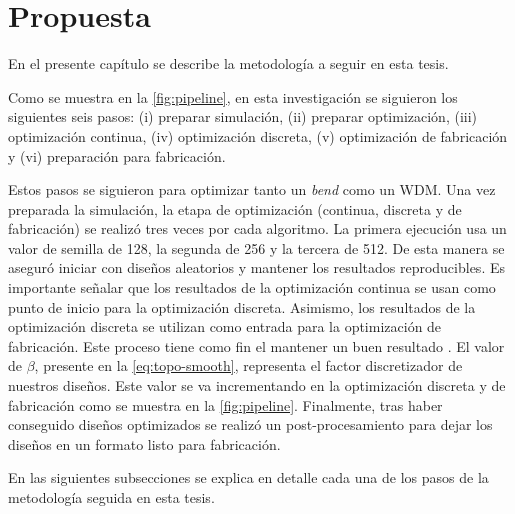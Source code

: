 \chapter{Propuesta}

En el presente capítulo se describe la metodología a seguir en esta tesis.

Como se muestra en la \autoref{fig:pipeline}, en esta investigación se siguieron los siguientes seis pasos:
(i) preparar simulación, 
(ii) preparar optimización, 
(iii) optimización continua,
(iv) optimización discreta,
(v) optimización de fabricación y
(vi) preparación para fabricación.

Estos pasos se siguieron para optimizar tanto un \emph{bend} como un WDM.
Una vez preparada la simulación, la etapa de optimización (continua, discreta y de fabricación) se realizó
tres veces por cada algoritmo.
La primera ejecución usa un valor de semilla de 128, la segunda de 256 y la tercera de 512.
De esta manera se aseguró iniciar con diseños aleatorios y mantener los resultados reproducibles.
Es importante señalar que los resultados de la optimización continua se usan como punto de inicio
para la optimización discreta. Asimismo, los resultados de la optimización discreta se utilizan como
entrada para la optimización de fabricación.
Este proceso tiene como fin el mantener un buen resultado \citep{Yang2017}.
El valor de $\beta$, presente en la \autoref{eq:topo-smooth}, representa el factor discretizador de nuestros diseños.
Este valor se va incrementando en la optimización discreta y de fabricación como se muestra en la
\autoref{fig:pipeline}.
Finalmente, tras haber conseguido diseños optimizados se realizó un post-procesamiento para dejar los diseños
en un formato listo para fabricación.

En las siguientes subsecciones se explica en detalle cada una de los pasos de la metodología seguida en esta tesis.

